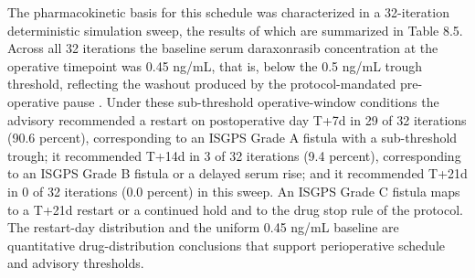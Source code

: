 The pharmacokinetic basis for this schedule was characterized in a 32-iteration
deterministic simulation sweep, the results of which are summarized in Table 8.5.
Across all 32 iterations the baseline serum daraxonrasib concentration at the
operative timepoint was 0.45 ng/mL, that is, below the 0.5 ng/mL trough
threshold, reflecting the washout produced by the protocol-mandated
pre-operative pause \cite{onpremwhippl}. Under these sub-threshold operative-window
conditions the advisory recommended a restart on postoperative day T+7d in 29 of
32 iterations (90.6 percent), corresponding to an ISGPS Grade A fistula with a
sub-threshold trough; it recommended T+14d in 3 of 32 iterations (9.4 percent),
corresponding to an ISGPS Grade B fistula or a delayed serum rise; and it
recommended T+21d in 0 of 32 iterations (0.0 percent) in this sweep. An ISGPS
Grade C fistula maps to a T+21d restart or a continued hold and to the drug
stop rule of the protocol. The restart-day distribution and the uniform 0.45
ng/mL baseline are quantitative drug-distribution conclusions that support perioperative schedule and advisory thresholds.

\clearpage

